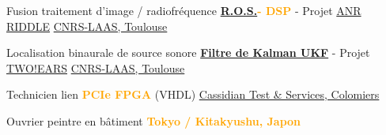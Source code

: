 \documentclass[
	a4paper,
	subsectioncolor=cvblue!70,
]{fortysecondscv}
\newcommand{\ros}{\href{http://www.ros.org/}{R.O.S.}}
\newcommand{\hl}[1]{\textbf{\textcolor{orange}{#1}}}
\begin{document}
\begin{cvtable}[2]
  {
    Fusion traitement d'image / radiofréquence\newline
    \hl{\ros - DSP} - Projet
    \href{http://www.agence-nationale-recherche.fr/Project-ANR-12-CORD-0003}{ANR
      RIDDLE}
  }
  {\href{https://www.laas.fr/public/fr}{CNRS-LAAS, Toulouse}}
  {}

  {
    Localisation binaurale de source sonore\newline
    \hl{\href{https://en.wikipedia.org/wiki/Kalman_filter\#Unscented_Kalman_filter}{Filtre de Kalman UKF}} - Projet \href{http://twoears.eu/}{TWO!EARS}
  }
  {\href{https://www.laas.fr/public/fr}{CNRS-LAAS, Toulouse}}
  {}

  {Technicien lien \hl{PCIe FPGA} (VHDL)}
  {\href{http://www.spherea.com/fr}{Cassidian Test \& Services, Colomiers}}
  {}

  {Ouvrier peintre en bâtiment}
  {\hl{Tokyo / Kitakyushu, Japon}}
  {}

\end{cvtable}



\end{document}
